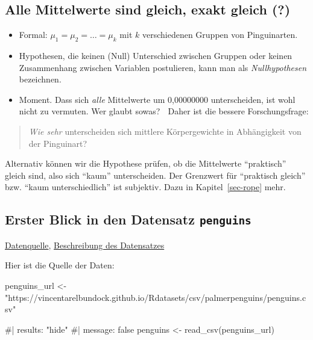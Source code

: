 \documentclass[
  a4paper,
  DIV=11]{scrreprt}
\newenvironment{Shaded}{\begin{snugshade}}{\end{snugshade}}
\newcommand{\CommentTok}[1]{\textcolor[rgb]{0.37,0.37,0.37}{#1}}
\newcommand{\FunctionTok}[1]{\textcolor[rgb]{0.28,0.35,0.67}{#1}}
\newcommand{\NormalTok}[1]{\textcolor[rgb]{0.00,0.23,0.31}{#1}}
\newcommand{\OtherTok}[1]{\textcolor[rgb]{0.00,0.23,0.31}{#1}}
\newcommand{\StringTok}[1]{\textcolor[rgb]{0.13,0.47,0.30}{#1}}
\theoremstyle{definition}
\theoremstyle{remark}
\begin{document}
\hypertarget{alle-mittelwerte-sind-gleich-exakt-gleich}{%
\subsection{Alle Mittelwerte sind gleich, exakt gleich
(?)}\label{alle-mittelwerte-sind-gleich-exakt-gleich}}

\begin{itemize}
\item
  Formal: \(\mu_1 = \mu_2 = \ldots = \mu_k\) mit \(k\) verschiedenen
  Gruppen von Pinguinarten.
\item
  Hypothesen, die keinen (Null) Unterschied zwischen Gruppen oder keinen
  Zusammenhang zwischen Variablen postulieren, kann man als
  \emph{Nullhypothesen} bezeichnen.
\item
  Moment. Dass sich \emph{alle} Mittelwerte um 0,00000000 unterscheiden,
  ist wohl nicht zu vermuten. Wer glaubt sowas? 🤔 Daher ist die bessere
  Forschungsfrage:
\end{itemize}

\begin{quote}
\emph{Wie sehr} unterscheiden sich mittlere Körpergewichte in
Abhängigkeit von der Pinguinart?
\end{quote}

Alternativ können wir die Hypothese prüfen, ob die Mittelwerte
``praktisch'' gleich sind, also sich ``kaum'' unterscheiden. Der
Grenzwert für ``praktisch gleich'' bzw. ``kaum unterschiedlich'' ist
subjektiv. Dazu in Kapitel~\ref{sec-rope} mehr.

\hypertarget{erster-blick-in-den-datensatz-penguins}{%
\subsection{\texorpdfstring{Erster Blick in den Datensatz
\texttt{penguins}}{Erster Blick in den Datensatz penguins}}\label{erster-blick-in-den-datensatz-penguins}}

\href{https://vincentarelbundock.github.io/Rdatasets/csv/palmerpenguins/penguins.csv}{Datenquelle},
\href{https://vincentarelbundock.github.io/Rdatasets/doc/palmerpenguins/penguins.html}{Beschreibung
des Datensatzes}

Hier ist die Quelle der Daten:

\begin{Shaded}
\begin{Highlighting}[]
\NormalTok{penguins\_url }\OtherTok{\textless{}{-}} \StringTok{"https://vincentarelbundock.github.io/Rdatasets/csv/palmerpenguins/penguins.csv"}

\CommentTok{\#| results: "hide"}
\CommentTok{\#| message: false}
\NormalTok{penguins }\OtherTok{\textless{}{-}} 
  \FunctionTok{read\_csv}\NormalTok{(penguins\_url)}
\end{Highlighting}
\end{Shaded}
\end{document}

